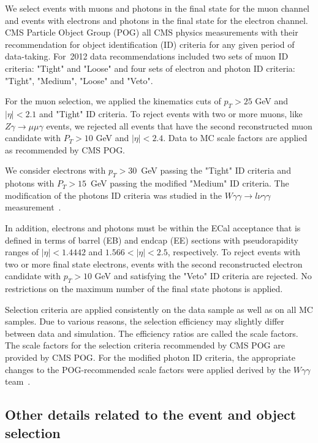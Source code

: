 We select events with muons and photons in the final state for the muon channel and events with electrons and photons in the final state for the electron channel. CMS Particle Object Group (POG) all CMS physics measurements with their recommendation for object identification (ID) criteria for any given period of data-taking. For~2012 data recommendations included two sets of muon ID criteria: "Tight" and "Loose" and four sets of electron and photon ID criteria: "Tight", "Medium", "Loose" and "Veto".

For the muon selection, we applied the kinematics cuts of $p_T>25$ GeV and $|\eta|<2.1$ and "Tight" ID criteria. To reject events with two or more muons, like $Z\gamma\rightarrow\mu\mu\gamma$ events, we rejected all events that have the second reconstructed muon candidate with $P_T>10$ GeV and $|\eta|<2.4$. Data to MC scale factors are applied as recommended by CMS POG.

We consider electrons with $p_T>30$~GeV passing the "Tight" ID criteria and photons with $P_T>15$~GeV passing the modified "Medium" ID criteria. The modification of the photons ID criteria was studied in the $W\gamma\gamma \rightarrow l\nu\gamma\gamma$ measurement~\cite{ref_Wgg8TeV}. 

In addition, electrons and photons must be within the ECal acceptance that is defined in terms of barrel (EB) and endcap (EE) sections with pseudorapidity ranges of $|\eta| < 1.4442$ and $1.566 < |\eta| < 2.5$, respectively. To reject events with two or more final state electrons, events with the second reconstructed electron candidate with $p_T>10$ GeV and satisfying the "Veto" ID criteria are rejected. No restrictions on the maximum number of the final state photons is applied. 

Selection criteria are applied consistently on the data sample as well as on all MC samples. Due to various reasons, the selection efficiency may slightly differ between data and simulation. The efficiency ratios are called the scale factors. The scale factors for the selection criteria recommended by CMS POG are provided by CMS POG. For the modified photon ID criteria, the appropriate changes to the POG-recommended scale factors were applied derived by the $W\gamma\gamma$ team~\cite{ref_Wgg8TeV}.


\subsection{Other details related to the event and object selection}

